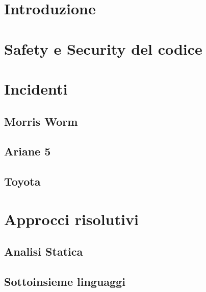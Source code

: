 \documentclass{acm_proc_article-sp}
\begin{document}
\section{Introduzione}


\section{Safety e Security del codice}


\section{Incidenti}

\subsection{Morris Worm}

\subsection{Ariane 5}

\subsection{Toyota}




\section{Approcci risolutivi}

\subsection{Analisi Statica}

\subsection{Sottoinsieme linguaggi} %

\end{document}
